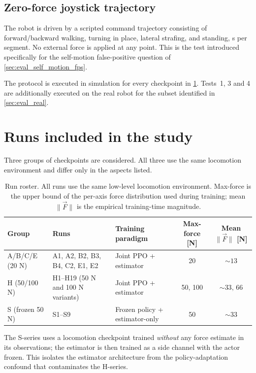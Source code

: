 \subsection{Zero-force joystick trajectory}
\label{sec:eval_protocol_joystick}
The robot is driven by a scripted command trajectory consisting of
forward/backward walking, turning in place, lateral strafing, and
standing, \unit[30]{s} per segment. No external force is applied at any
point. This is the test introduced specifically for the self-motion
false-positive question of \cref{sec:eval_self_motion_fps}.

\medskip

The protocol is executed in simulation for every checkpoint in
\cref{sec:eval_runs}. Tests~1, 3 and 4 are additionally executed on the
real robot for the subset identified in \cref{sec:eval_real}.

\section{Runs included in the study}
\label{sec:eval_runs}

Three groups of checkpoints are considered. All three use the same
locomotion environment and differ only in the aspects listed.

\begin{table}[h]
\centering
\caption{Run roster. All runs use the same low-level locomotion environment.
Max-force is the upper bound of the per-axis force distribution used during
training; mean $\|\vec{F}\|$ is the empirical training-time magnitude.}
\label{tab:eval_runs}
\begin{tabular}{lllcc}
\hline
Group & Runs & Training paradigm & Max-force [N] & Mean $\|\vec{F}\|$ [N] \\
\hline \hline
A/B/C/E (20 N) & A1, A2, B2, B3, B4, C2, E1, E2 & Joint PPO + estimator & 20 & $\sim 13$ \\
H (50/100 N)   & H1--H19 (50 N and 100 N variants) & Joint PPO + estimator & 50, 100 & $\sim 33,\,66$ \\
S (frozen 50 N) & S1--S9 & Frozen policy + estimator-only & 50 & $\sim 33$ \\
\hline
\end{tabular}
\end{table}

The S-series uses a locomotion checkpoint trained \emph{without} any force
estimate in its observations; the estimator is then trained as a side
channel with the actor frozen. This isolates the estimator architecture
from the policy-adaptation confound that contaminates the H-series.

